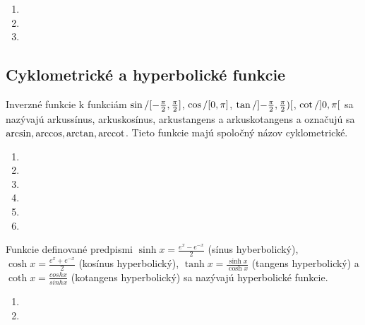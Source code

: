 \begin{enumerate}[resume]
  \item {}
  \item {}
  \item {}
\end{enumerate}

\subsection{Cyklometrické a hyperbolické funkcie}

Inverzné funkcie k funkciám
$\sin / \interval{-\frac{\pi}{2}}{\frac{\pi}{2}}$,
$\cos / \interval{0}{\pi}$,
$\tan / \interval[open]{-\frac{\pi}{2}}{\frac{\pi}{2})}$,
$\cot / \interval[open]{0}{\pi}$
sa nazývajú arkussínus, arkuskosínus, arkustangens a arkuskotangens a označujú
sa $\arcsin, \arccos, \arctan, \operatorname{arccot}$. Tieto funkcie majú spoločný názov
cyklometrické.

\begin{enumerate}[resume]

  \item {}
  \item {}
  \item {}
  \showanswers
  \item {}
  \item {}
  \hideanswers
  \item {}
\end{enumerate}

Funkcie definované predpismi
$\sinh x=\frac{e^x-e^{-x}}{2}$ (sínus hyberbolický),
$\cosh x=\frac{e^x+e^{-x}}{2}$ (kosínus hyperbolický),
$\tanh x=\frac{\sinh x}{\cosh x}$ (tangens hyperbolický) a
$\coth x=\frac{cosh x}{sinh x}$ (kotangens hyperbolický) sa
nazývajú hyperbolické funkcie.

\begin{enumerate}[resume]
  \item {}
  \item {}
\end{enumerate}

